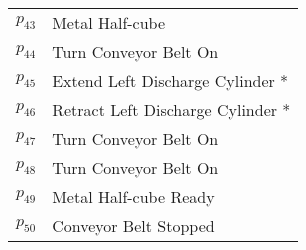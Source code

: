 \begin{longtable}{M{5cm}M{10cm}}
\hyperlink{partialNet:p43}{\hypertarget{partialTable:p43}{$p_{43}$}} & Metal Half-cube\\
\hyperlink{partialNet:p44}{\hypertarget{partialTable:p44}{$p_{44}$}} & Turn Conveyor Belt On\\
\hyperlink{partialNet:p45}{\hypertarget{partialTable:p45}{$p_{45}$}} & Extend Left Discharge Cylinder *\\
\hyperlink{partialNet:p46}{\hypertarget{partialTable:p46}{$p_{46}$}} & Retract Left Discharge Cylinder *\\
\hyperlink{partialNet:p47}{\hypertarget{partialTable:p47}{$p_{47}$}} & Turn Conveyor Belt On\\
\hyperlink{partialNet:p48}{\hypertarget{partialTable:p48}{$p_{48}$}} & Turn Conveyor Belt On\\
\hyperlink{partialNet:p49}{\hypertarget{partialTable:p49}{$p_{49}$}} & Metal Half-cube Ready\\
\hyperlink{partialNet:p50}{\hypertarget{partialTable:p50}{$p_{50}$}} & Conveyor Belt Stopped\\
\end{longtable}
